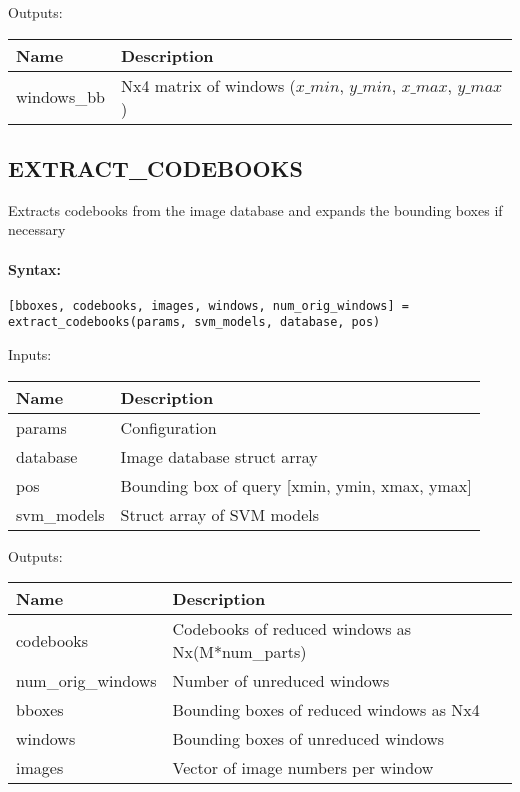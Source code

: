 \bigskip
Outputs:

\begin{tabular}{|p{}|p{}|}
\hline
\textbf{Name} & \textbf{Description} \\
\hline \hline
windows\_bb & Nx4 matrix of windows ($x\_{min}$, $y\_{min}$, $x\_{max}$, $y\_{max}$)  \\ \hline
\end{tabular}

\subsection{EXTRACT\_CODEBOOKS}

Extracts codebooks from the image database and expands the bounding boxes if necessary

\paragraph{Syntax:} \verb|[bboxes, codebooks, images, windows, num_orig_windows] = extract_codebooks(params, svm_models, database, pos)|

\bigskip
Inputs:

\begin{tabular}{|p{}|p{}|}
\hline
\textbf{Name} & \textbf{Description} \\
\hline \hline
params & Configuration  \\ \hline
database & Image database struct array  \\ \hline
pos & Bounding box of query [xmin, ymin, xmax, ymax]  \\ \hline
svm\_models & Struct array of SVM models  \\ \hline
\end{tabular}

\bigskip
Outputs:

\begin{tabular}{|p{}|p{}|}
\hline
\textbf{Name} & \textbf{Description} \\
\hline \hline
codebooks & Codebooks of reduced windows as Nx(M*num\_parts)  \\ \hline
num\_orig\_windows & Number of unreduced windows  \\ \hline
bboxes & Bounding boxes of reduced windows as Nx4  \\ \hline
windows & Bounding boxes of unreduced windows  \\ \hline
images & Vector of image numbers per window  \\ \hline
\end{tabular}

